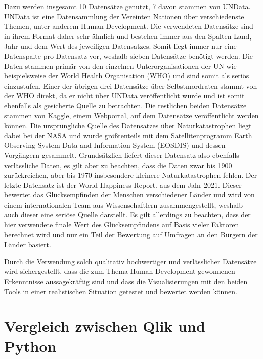 \documentclass[12pt]{article}
\begin{document}
	Dazu werden insgesamt 10 Datensätze genutzt, 7 davon stammen von UNData. UNData ist eine Datensammlung der Vereinten Nationen über verschiedenste Themen, unter anderem Human Development. Die verwendeten Datensätze sind in ihrem Format daher sehr ähnlich und bestehen immer aus den Spalten Land, Jahr und dem Wert des jeweiligen Datensatzes. Somit liegt immer nur eine Datenspalte pro Datensatz vor, weshalb sieben Datensätze benötigt werden. Die Daten stammen primär von den einzelnen Unterorganisationen der UN wie beispielsweise der World Health Organisation (WHO) und sind somit als seriös einzustufen. Einer der übrigen drei Datensätze über Selbstmordraten stammt von der WHO direkt, da er nicht über UNData veröffentlicht wurde und ist somit ebenfalls als gesicherte Quelle zu betrachten. Die restlichen beiden Datensätze stammen von Kaggle, einem Webportal, auf dem Datensätze veröffentlicht werden können. Die ursprüngliche Quelle des Datensatzes über Naturkatastrophen liegt dabei bei der NASA und wurde größtenteils mit dem Satellitenprogramm Earth Observing System Data and Information System (EOSDIS) und dessen Vorgängern gesammelt. Grundsätzlich liefert dieser Datensatz also ebenfalls verlässliche Daten, es gilt aber zu beachten, dass die Daten zwar bis 1900 zurückreichen, aber bis 1970 insbesondere kleinere Naturkatastrophen fehlen. Der letzte Datensatz ist der World Happiness Report.
	aus dem Jahr 2021. Dieser bewertet das Glücksempfinden der Menschen verschiedener Länder und wird von einem internationalen Team aus Wissenschaftlern zusammengestellt, weshalb auch dieser eine seriöse Quelle darstellt. Es gilt allerdings zu beachten, dass der hier verwendete finale Wert des Glücksempfindens auf Basis vieler Faktoren berechnet wird und nur ein Teil der Bewertung auf Umfragen an den Bürgern der Länder basiert.
	
	Durch die Verwendung solch qualitativ hochwertiger und verlässlicher Datensätze wird sichergestellt, dass die zum Thema Human Development gewonnenen Erkenntnisse aussagekräftig sind und dass die Visualisierungen mit den beiden Tools in einer realistischen Situation getestet und bewertet werden können.
	\section{Vergleich zwischen Qlik und Python}
	
\end{document}
